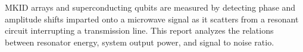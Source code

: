 
MKID arrays and superconducting qubits are measured by detecting phase and amplitude shifts imparted onto a microwave signal as it scatters from a resonant circuit interrupting a transmission line.
This report analyzes the relations between resonator energy, system output power, and signal to noise ratio.
